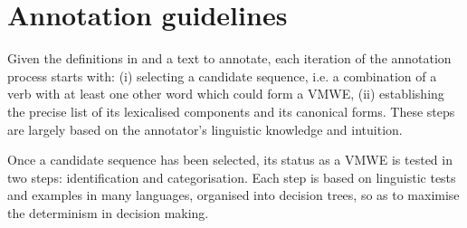 \documentclass[output=paper,
modfonts,
]{langscibook}
\begin{document}
\section{Annotation guidelines}
\label{sec:annotation}
%
Given the definitions in   and a text to annotate, each iteration of the annotation process starts with: (i) selecting a candidate sequence, i.e. a combination of a verb  with at least one other word which could form a VMWE, (ii) establishing the precise list of its lexicalised components and its canonical forms. These steps are largely based on the annotator's linguistic knowledge and intuition.

Once a candidate sequence has been selected, its status as a VMWE is tested in two steps: identification and categorisation. Each step is based on linguistic tests and examples in many languages, organised into decision trees, so as to maximise the determinism in decision making. 

%

\end{document}
